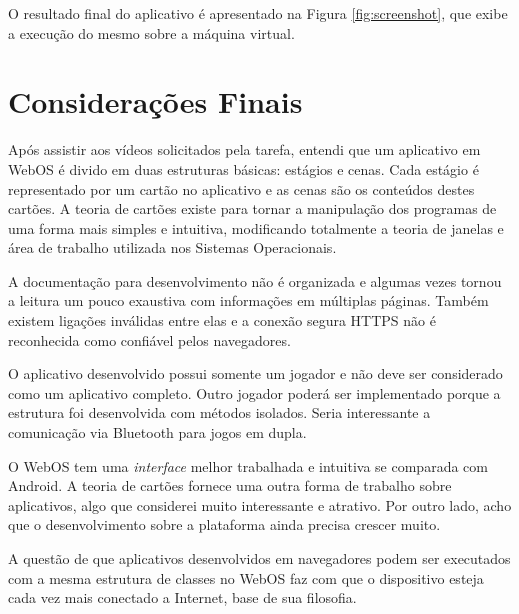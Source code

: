 \documentclass{article}
\begin{document}
O resultado final do aplicativo é apresentado na Figura \ref{fig:screenshot},
que exibe a execução do mesmo sobre a máquina virtual.

\section{Considerações Finais}
\label{sec:consideracoes}

Após assistir aos vídeos solicitados pela tarefa, entendi que um aplicativo em
WebOS é divido em duas estruturas básicas: estágios e cenas. Cada estágio é
representado por um cartão no aplicativo e as cenas são os conteúdos destes
cartões. A teoria de cartões existe para tornar a manipulação dos programas de
uma forma mais simples e intuitiva, modificando totalmente a teoria de janelas e
área de trabalho utilizada nos Sistemas Operacionais.

A documentação para desenvolvimento não é organizada e algumas vezes tornou a
leitura um pouco exaustiva com informações em múltiplas páginas. Também existem
ligações inválidas entre elas e a conexão segura HTTPS não é reconhecida como
confiável pelos navegadores.

O aplicativo desenvolvido possui somente um jogador e não deve ser considerado
como um aplicativo completo. Outro jogador poderá ser implementado porque a
estrutura foi desenvolvida com métodos isolados. Seria interessante a
comunicação via Bluetooth para jogos em dupla.

O WebOS tem uma \emph{interface} melhor trabalhada e intuitiva se comparada com
Android. A teoria de cartões fornece uma outra forma de trabalho sobre
aplicativos, algo que considerei muito interessante e atrativo. Por outro lado,
acho que o desenvolvimento sobre a plataforma ainda precisa crescer muito.

A questão de que aplicativos desenvolvidos em navegadores podem ser executados
com a mesma estrutura de classes no WebOS faz com que o dispositivo esteja cada
vez mais conectado a Internet, base de sua filosofia.
\end{document}
